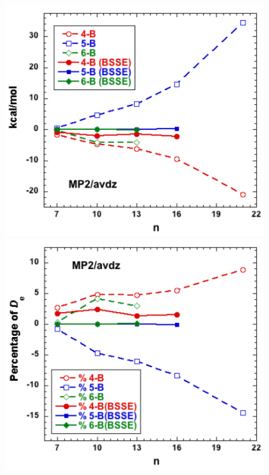 \begin{figure}[t]
\uwsinglespace
\begin{center}
\begin{minipage}{0.45\textwidth}
\includegraphics[width=\textwidth]{Figures/Chapter_2/4_B_6_B_vs_n.pdf}
\end{minipage}
\begin{minipage}{0.45\textwidth}
\includegraphics[width=\textwidth]{Figures/Chapter_2/4_B_6_B_perc_vs_n.pdf}

\end{minipage}
\end{center}
\end{figure}
